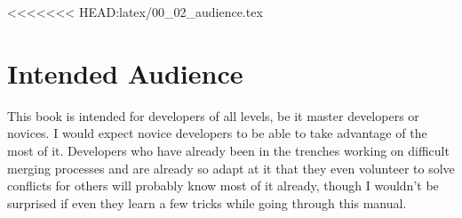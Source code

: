 <<<<<<< HEAD:latex/00_02_audience.tex

\section{Intended Audience}

This book is intended for developers of all levels, be it master developers or novices. I would expect novice developers to be able to take advantage of the most of it. Developers who have already been in the trenches working on difficult merging processes and are already so adapt at it that they even volunteer to solve conflicts for others will probably know most of it already, though I wouldn't be surprised if even they learn a few tricks while going through this manual.

